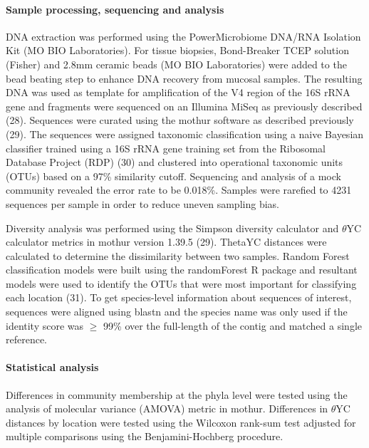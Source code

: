 \documentclass[11pt,]{article}
\let\oldparagraph\paragraph
\renewcommand{\paragraph}[1]{\oldparagraph{#1}\mbox{}}
\begin{document}
\paragraph{Sample processing, sequencing and
analysis}\label{sample-processing-sequencing-and-analysis}

DNA extraction was performed using the PowerMicrobiome DNA/RNA Isolation
Kit (MO BIO Laboratories). For tissue biopsies, Bond-Breaker TCEP
solution (Fisher) and 2.8mm ceramic beads (MO BIO Laboratories) were
added to the bead beating step to enhance DNA recovery from mucosal
samples. The resulting DNA was used as template for amplification of the
V4 region of the 16S rRNA gene and fragments were sequenced on an
Illumina MiSeq as previously described (28). Sequences were curated
using the mothur software as described previously (29). The sequences
were assigned taxonomic classification using a naive Bayesian classifier
trained using a 16S rRNA gene training set from the Ribosomal Database
Project (RDP) (30) and clustered into operational taxonomic units (OTUs)
based on a 97\% similarity cutoff. Sequencing and analysis of a mock
community revealed the error rate to be 0.018\%. Samples were rarefied
to 4231 sequences per sample in order to reduce uneven sampling bias.

Diversity analysis was performed using the Simpson diversity calculator
and \(\theta\)YC calculator metrics in mothur version 1.39.5 (29).
ThetaYC distances were calculated to determine the dissimilarity between
two samples. Random Forest classification models were built using the
randomForest R package and resultant models were used to identify the
OTUs that were most important for classifying each location (31). To get
species-level information about sequences of interest, sequences were
aligned using blastn and the species name was only used if the identity
score was \(\ge\) 99\% over the full-length of the contig and matched a
single reference.

\paragraph{Statistical analysis}\label{statistical-analysis}

Differences in community membership at the phyla level were tested using
the analysis of molecular variance (AMOVA) metric in mothur. Differences
in \(\theta\)YC distances by location were tested using the Wilcoxon
rank-sum test adjusted for multiple comparisons using the
Benjamini-Hochberg procedure.
\end{document}

